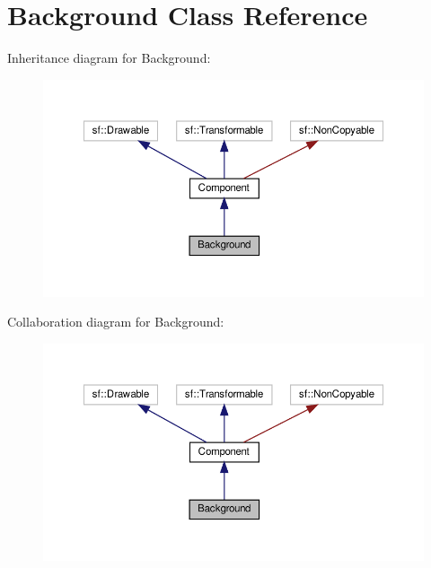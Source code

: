 \hypertarget{classBackground}{}\section{Background Class Reference}
\label{classBackground}


Inheritance diagram for Background\+:
\nopagebreak
\begin{figure}[H]
\begin{center}
\leavevmode
\includegraphics[width=350pt]{classBackground__inherit__graph}
\end{center}
\end{figure}


Collaboration diagram for Background\+:
\nopagebreak
\begin{figure}[H]
\begin{center}
\leavevmode
\includegraphics[width=350pt]{classBackground__coll__graph}
\end{center}
\end{figure}
